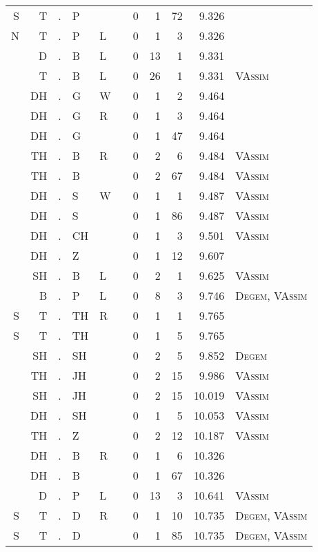 \begin{longtable}{r@{ } r@{ } c@{ } l@{ } l@{ } l@{ } r r r r l }
S & T & . & P &   &   & 0 & 1 & 72 & 9.326 &  \\
N & T & . & P & L &   & 0 & 1 & 3 & 9.326 &  \\
  & D & . & B & L &   & 0 & 13 & 1 & 9.331 &  \\
  & T & . & B & L &   & 0 & 26 & 1 & 9.331 & \textsc{VAssim} \\
  & DH & . & G & W &   & 0 & 1 & 2 & 9.464 &  \\
  & DH & . & G & R &   & 0 & 1 & 3 & 9.464 &  \\
  & DH & . & G &   &   & 0 & 1 & 47 & 9.464 &  \\
  & TH & . & B & R &   & 0 & 2 & 6 & 9.484 & \textsc{VAssim} \\
  & TH & . & B &   &   & 0 & 2 & 67 & 9.484 & \textsc{VAssim} \\
  & DH & . & S & W &   & 0 & 1 & 1 & 9.487 & \textsc{VAssim} \\
  & DH & . & S &   &   & 0 & 1 & 86 & 9.487 & \textsc{VAssim} \\
  & DH & . & CH &   &   & 0 & 1 & 3 & 9.501 & \textsc{VAssim} \\
  & DH & . & Z &   &   & 0 & 1 & 12 & 9.607 &  \\
  & SH & . & B & L &   & 0 & 2 & 1 & 9.625 & \textsc{VAssim} \\
  & B & . & P & L &   & 0 & 8 & 3 & 9.746 & \textsc{Degem}, \textsc{VAssim} \\
S & T & . & TH & R &   & 0 & 1 & 1 & 9.765 &  \\
S & T & . & TH &   &   & 0 & 1 & 5 & 9.765 &  \\
  & SH & . & SH &   &   & 0 & 2 & 5 & 9.852 & \textsc{Degem} \\
  & TH & . & JH &   &   & 0 & 2 & 15 & 9.986 & \textsc{VAssim} \\
  & SH & . & JH &   &   & 0 & 2 & 15 & 10.019 & \textsc{VAssim} \\
  & DH & . & SH &   &   & 0 & 1 & 5 & 10.053 & \textsc{VAssim} \\
  & TH & . & Z &   &   & 0 & 2 & 12 & 10.187 & \textsc{VAssim} \\
  & DH & . & B & R &   & 0 & 1 & 6 & 10.326 &  \\
  & DH & . & B &   &   & 0 & 1 & 67 & 10.326 &  \\
  & D & . & P & L &   & 0 & 13 & 3 & 10.641 & \textsc{VAssim} \\
S & T & . & D & R &   & 0 & 1 & 10 & 10.735 & \textsc{Degem}, \textsc{VAssim} \\
S & T & . & D &   &   & 0 & 1 & 85 & 10.735 & \textsc{Degem}, \textsc{VAssim} \\

\end{longtable}
